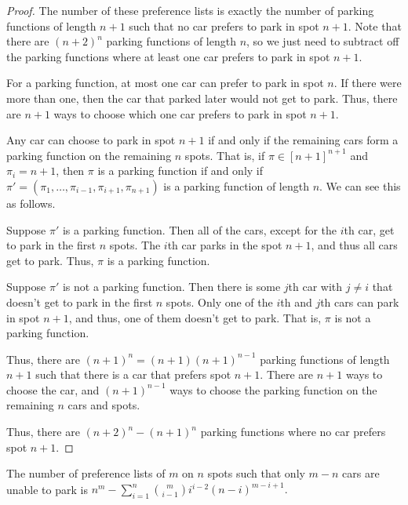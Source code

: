 \begin{proof}
    The number of these preference lists is exactly the number of parking functions of length $n + 1$ such that no car prefers to park in spot $n + 1$. Note that there are $(n + 2)^n$ parking functions of length $n$, so we just need to subtract off the parking functions where at least one car prefers to park in spot $n + 1$.

    For a parking function, at most one car can prefer to park in spot $n$. If there were more than one, then the car that parked later would not get to park. Thus, there are $n + 1$ ways to choose which one car prefers to park in spot $n + 1$. 

    Any car can choose to park in spot $n + 1$ if and only if the remaining cars form a parking function on the remaining $n$ spots. That is, if $\pi \in [n + 1]^{n + 1}$ and $\pi_i = n + 1$, then $\pi$ is a parking function if and only if $\pi' = (\pi_1, \dots, \pi_{i - 1}, \pi_{i + 1}, \pi_{n + 1})$ is a parking function of length $n$. We can see this as follows.

    Suppose $\pi'$ is a parking function. Then all of the cars, except for the $i$th car, get to park in the first $n$ spots. The $i$th car parks in the spot $n + 1$, and thus all cars get to park. Thus, $\pi$ is a parking function.
    
    Suppose $\pi'$ is not a parking function. Then there is some $j$th car with $j \neq i$ that doesn't get to park in the first $n$ spots. Only one of the $i$th and $j$th cars can park in spot $n + 1$, and thus, one of them doesn't get to park. That is, $\pi$ is not a parking function.

    Thus, there are $(n + 1)^n = (n + 1)(n + 1)^{n - 1}$ parking functions of length $n + 1$ such that there is a car that prefers spot $n + 1$. There are $n + 1$ ways to choose the car, and $(n + 1)^{n - 1}$ ways to choose the parking function on the remaining $n$ cars and spots.

    Thus, there are $(n + 2)^n - (n + 1)^n$ parking functions where no car prefers spot $n + 1$.
\end{proof}

\begin{proposition}
    The number of preference lists of $m$ on $n$ spots such that only $m-n$ cars are unable to park is $\displaystyle n^m-\sum_{i=1}^n \binom{m}{i-1}i^{i-2}(n-i)^{m-i+1}.$
\end{proposition}

